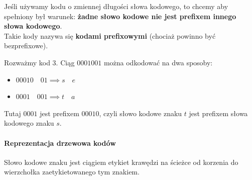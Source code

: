 Jeśli używamy kodu o zmiennej długości słowa kodowego, to chcemy aby spełniony był warunek: \textbf{żadne słowo kodowe nie jest prefixem innego słowa kodowego}. \\
Takie kody nazywa się \textbf{kodami prefixowymi} (chociaż powinno być bezprefixowe).

Rozważmy kod 3. Ciąg $0001001$ można odkodować na dwa sposoby: 
\begin{itemize}[nosep]
	\item $00010 \quad 01 \implies s \quad e$
	\item $0001 \quad 001 \implies t \quad a$
\end{itemize}
Tutaj $0001$ jest prefixem $00010$, czyli słowo kodowe znaku $t$ jest prefixem słowa kodowego znaku $s$.

\paragraph{Reprezentacja drzewowa kodów}
Słowo kodowe znaku jest ciągiem etykiet krawędzi na ścieżce od korzenia do wierzchołka zaetykietowanego tym znakiem.

